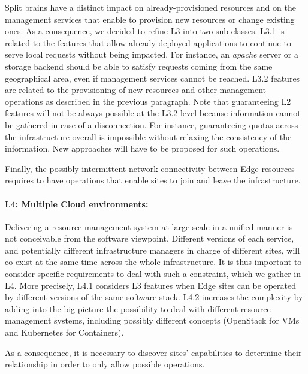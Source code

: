 Split brains have a distinct impact on already-provisioned resources and on the
management services that enable to provision new resources or change existing
ones. As a consequence, we decided to refine L3 into two sub-classes. L3.1 is
related to the features that allow already-deployed applications to continue to
serve local requests without being impacted. For instance, an \emph{apache}
server or a storage backend should be able to satisfy requests coming from the
same geographical area, even if management services cannot be reached. L3.2
features are related to the provisioning of new resources and other management
operations as described in the previous paragraph.
%
Note that guaranteeing L2 features will not be always possible at the L3.2
level because information cannot be gathered in case of a disconnection. For
instance, guaranteeing quotas across the infrastructure overall is impossible
without relaxing the consistency of the information. New approaches will have
to be proposed for such operations.

Finally, the possibly intermittent network connectivity between Edge resources
requires to have operations that enable sites to join and leave the
infrastructure.


\paragraph{L4: Multiple Cloud environments:}
Delivering a resource management system at large scale in a unified manner is
not conceivable from the software viewpoint. Different versions of each
service, and potentially different infrastructure managers in charge of
different sites, will co-exist at the same time across the whole
infrastructure. It is thus important to consider specific requirements to deal
with such a constraint, which we gather in L4.
%
More precisely, L4.1 considers L3 features when Edge sites can be
operated by different versions of the same software stack.
%
L4.2 increases the complexity by adding into the big picture the
possibility to deal with different resource management systems,
including possibly different concepts (\eg OpenStack for VMs and
Kubernetes for Containers).

As a consequence, it is necessary to discover sites' capabilities to
determine their relationship in order to only allow possible operations.

